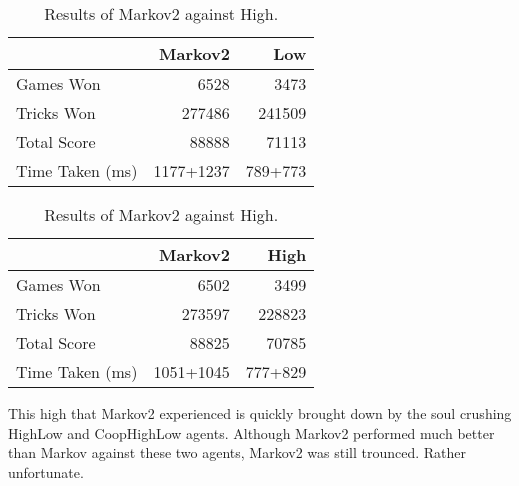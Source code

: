 \begin{table}[ht]
    \begin{minipage}{.5\linewidth}
        \centering
        \begin{tabular}{l|rr}
            ~               &   Markov2 &   Low  \\  \hline
            Games Won       &   6528        &   3473   \\
            Tricks Won      &   277486      &   241509 \\
            Total Score     &   88888       &   71113  \\
            Time Taken (ms) &   1177+1237   &   789+773
        \end{tabular}
        \caption{Results of Markov2 against Low.}
        \label{tab:markov2_low}
    \end{minipage}%
    \begin{minipage}{.5\linewidth}
        \centering
        \begin{tabular}{l|rr}
            ~               &   Markov2 &   High  \\  \hline
            Games Won       &   6502        &   3499   \\
            Tricks Won      &   273597      &   228823 \\
            Total Score     &   88825       &   70785  \\
            Time Taken (ms) &   1051+1045   &   777+829
        \end{tabular}
        \caption{Results of Markov2 against High.}
        \label{tab:markov2_high}
    \end{minipage} 
\end{table}



This high that Markov2 experienced is quickly brought down by the soul crushing HighLow and CoopHighLow agents. Although Markov2
performed much better than Markov against these two agents, Markov2 was still trounced. Rather unfortunate.

